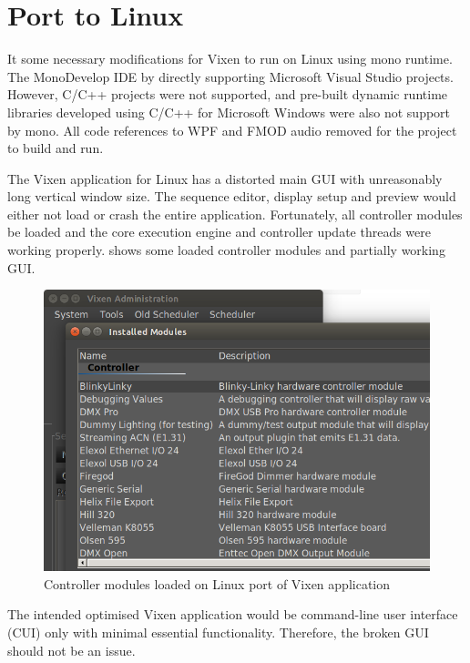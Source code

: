 \section{Port to Linux}

It  some necessary modifications for Vixen to run on Linux using mono runtime. The MonoDevelop IDE \cite{monodevelop}  by directly supporting Microsoft Visual Studio projects. However, C/C++ projects were not supported, and pre-built dynamic runtime libraries developed using C/C++ for Microsoft Windows were also not support by mono. All code references to WPF and FMOD audio  removed for the project to build and run.

The  Vixen application for Linux has a distorted main GUI with unreasonably long vertical window size. The sequence editor, display setup and preview would either not load or crash the entire application. Fortunately, all controller modules  be loaded and the core execution engine and controller update threads were working properly.  shows some loaded controller modules and partially working GUI.

\begin{figure}[t]
  \centering
  \includegraphics[width=0.8\columnwidth]{Figs/vixen_linux_controllers.png}
  \caption{\footnotesize Controller modules loaded on Linux port of Vixen application}
  \label{fig:vixen_linux_main}
\end{figure}

The intended optimised Vixen application would be command-line user interface (CUI) only with minimal essential functionality. Therefore, the broken GUI should not be an issue.

